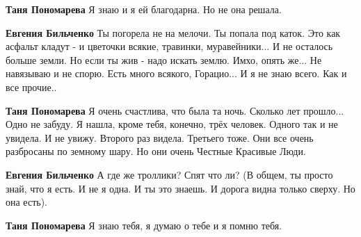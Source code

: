 \begin{itemize}
\begin{itemize}
 
\textbf{Таня Пономарева} Я знаю и я ей благодарна. Но не она решала.

 
\textbf{Евгения Бильченко} Ты погорела не на мелочи. Ты попала под каток. Это
как асфальт кладут - и цветочки всякие, травинки, муравейники... И не осталось
больше земли. Но если ты жив - надо искать землю. Имхо, опять же... Не
навязываю и не спорю. Есть много всякого, Горацио... И я не знаю всего. Как и
все прочие..

 
\textbf{Таня Пономарева} Я очень счастлива, что была та ночь. Сколько лет
прошло... Одно не забуду. Я нашла, кроме тебя, конечно, трёх человек. Одного
так и не увидела. И не увижу. Второго раз видела. Третьего тоже. Они все очень
разбросаны по земному шару. Но они очень Честные Красивые Люди.

 
\textbf{Евгения Бильченко} А где же троллики? Спят что ли? (В общем, ты просто знай, что я есть. И не я одна. И ты это знаешь. И дорога видна только сверху. Но она есть).

 
\textbf{Таня Пономарева} Я знаю тебя, я думаю о тебе и я помню тебя.


\end{itemize}
\end{itemize}
